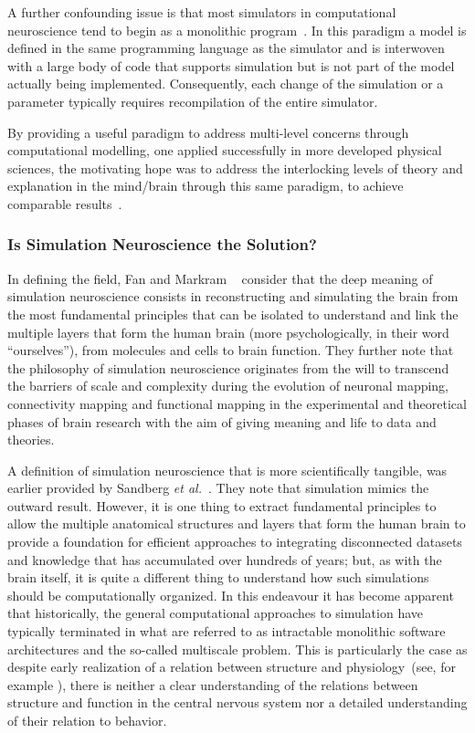 \documentclass[10pt,letterpaper]{article}
\begin{document}
A further confounding issue is that most simulators in computational neuroscience tend to begin as a monolithic program~\cite{cannon07:_inter}. In this paradigm a model is defined in the same programming language as the simulator and is interwoven with a large body of code that supports simulation but is not part of the model actually being implemented. Consequently, each change of the simulation or a parameter typically requires recompilation of the entire simulator.

By providing a useful paradigm to address multi-level concerns through computational modelling, one applied successfully in more developed physical sciences, the motivating hope was to address the interlocking levels of theory and explanation in the mind/brain through this same paradigm, to achieve comparable results~\cite{bickle19}.

\subsubsection*{Is Simulation Neuroscience the Solution?}
\label{subsection:simneuro}

In defining the field, Fan and Markram ~\cite{fan19} consider that the deep meaning of simulation neuroscience consists in reconstructing and simulating the brain from the most fundamental principles that can be isolated to understand and link the multiple layers that form the human brain (more psychologically, in their word ``ourselves''), from molecules and cells to brain function. They further note that the philosophy of simulation neuroscience originates from the will to transcend the barriers of scale and complexity during the evolution of neuronal mapping, connectivity mapping and functional mapping in the experimental and theoretical phases of brain research with the aim of giving meaning and life to data and theories.

A definition of simulation neuroscience that is more scientifically tangible, was earlier provided by Sandberg {\it{et al}.}~\cite{sandberg08}. They note that simulation mimics the outward result. However, it is one thing to extract fundamental principles to allow the multiple anatomical structures and layers that form the human brain to provide a foundation for efficient approaches to integrating disconnected datasets and knowledge that has accumulated over hundreds of years; but, as with the brain itself, it is quite a different thing to understand how such simulations should be computationally organized. In this endeavour it has become apparent that historically, the general computational approaches to simulation have typically terminated in what are referred to as intractable monolithic software architectures and the so-called multiscale problem.
This is particularly the case as despite early realization of a relation between structure and physiology~(see, for example \cite{sieck17}), there is neither a clear understanding of the relations between structure and function in the central nervous system nor a detailed understanding of their relation to behavior.
\end{document}
